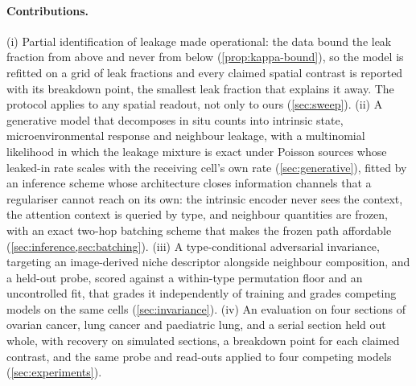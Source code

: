 \paragraph{Contributions.} 
(i) Partial identification of leakage made operational: the data bound the leak fraction from above and never from below (\cref{prop:kappa-bound}), so the model is refitted on a grid of leak fractions and every claimed spatial contrast is reported with its breakdown point, the smallest leak fraction that explains it away. The protocol applies to any spatial readout, not only to ours (\cref{sec:sweep}). (ii) A generative model that decomposes in situ counts into intrinsic state, microenvironmental response and neighbour leakage, with a multinomial likelihood in which the leakage mixture is exact under Poisson sources whose leaked-in rate scales with the receiving cell's own rate (\cref{sec:generative}), fitted by an inference scheme whose architecture closes information channels that a regulariser cannot reach on its own: the intrinsic encoder never sees the context, the attention context is queried by type, and neighbour quantities are frozen, with an exact two-hop batching scheme that makes the frozen path affordable (\cref{sec:inference,sec:batching}). (iii) A type-conditional adversarial invariance, targeting an image-derived niche descriptor alongside neighbour composition, and a held-out probe, scored against a within-type permutation floor and an uncontrolled fit, that grades it independently of training and grades competing models on the same cells (\cref{sec:invariance}). (iv) An evaluation on four sections of ovarian cancer, lung cancer and paediatric lung, and a serial section held out whole, with recovery on simulated sections, a breakdown point for each claimed contrast, and the same probe and read-outs applied to four competing models (\cref{sec:experiments}).
